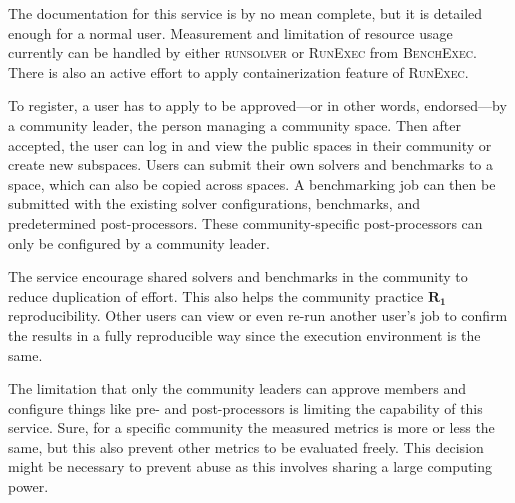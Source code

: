 The documentation for this service is by no mean complete, but it is detailed enough for a normal user.
Measurement and limitation of resource usage currently can be handled by either \textsc{runsolver} or \textsc{RunExec} from \textsc{BenchExec}.
There is also an active effort to apply containerization feature of \textsc{RunExec}.

To register, a user has to apply to be approved---or in other words, endorsed---by a community leader, the person managing a community space.
Then after accepted, the user can log in and view the public spaces in their community or create new subspaces.
Users can submit their own solvers and benchmarks to a space, which can also be copied across spaces.
A benchmarking job can then be submitted with the existing solver configurations, benchmarks, and predetermined post-processors.
These community-specific post-processors can only be configured by a community leader.

The service encourage shared solvers and benchmarks in the community to reduce duplication of effort.
This also helps the community practice $\bm{R_1}$ reproducibility.
Other users can view or even re-run another user's job to confirm the results in a fully reproducible way since the execution environment is the same.

The limitation that only the community leaders can approve members and configure things like pre- and post-processors is limiting the capability of this service.
Sure, for a specific community the measured metrics is more or less the same, but this also prevent other metrics to be evaluated freely.
This decision might be necessary to prevent abuse as this involves sharing a large computing power.
